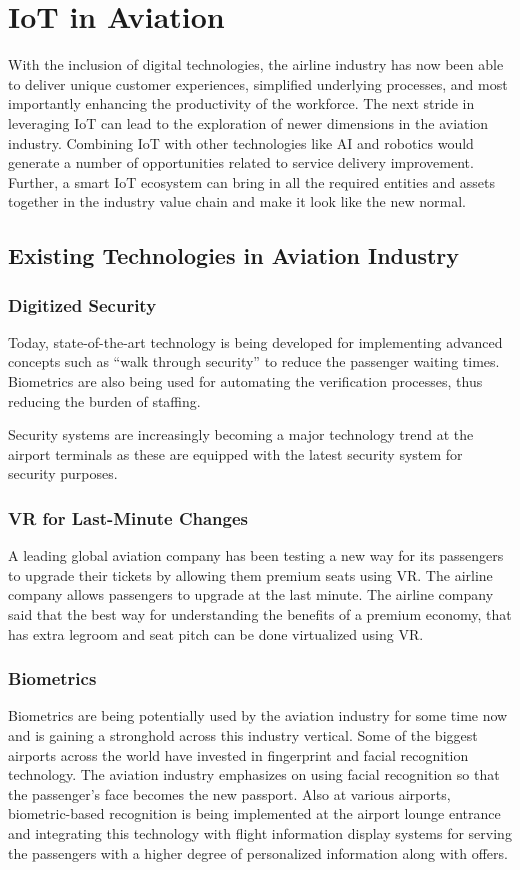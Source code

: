 \documentclass[a4paper,12pt]{article}
\begin{document}
\section{IoT in Aviation}
With the inclusion of digital technologies, the airline industry has now been able to deliver unique customer experiences, simplified underlying processes, and most importantly enhancing the productivity of the workforce. The next stride in leveraging IoT can lead to the exploration of newer dimensions in the aviation industry. Combining IoT with other technologies like AI and robotics would generate a number of opportunities related to service delivery improvement. Further, a smart  IoT ecosystem can bring in all the required entities and assets together in the industry value chain and make it look like the new normal.

\subsection{Existing Technologies in Aviation Industry}
\subsubsection{Digitized Security}
Today, state-of-the-art technology is being developed for implementing advanced concepts such as “walk through security” to reduce the passenger waiting times. Biometrics are also being used for automating the verification processes, thus reducing the burden of staffing.

Security systems are increasingly becoming a major technology trend at the airport terminals as these are equipped with the latest security system for security purposes.

\subsubsection{VR for Last-Minute Changes}
A leading global aviation company has been testing a new way for its passengers to upgrade their tickets by allowing them premium seats using VR. The airline company allows passengers to upgrade at the last  minute. The airline company said that the best way for understanding the benefits of a premium economy, that has extra legroom and seat pitch can be done virtualized using VR.

\subsubsection{Biometrics}
Biometrics are being potentially used by the aviation industry for some time now and is gaining a stronghold across this industry vertical. Some of the biggest airports across the world have invested in fingerprint and facial recognition technology. The aviation industry emphasizes on using facial recognition so that the passenger’s face becomes the new passport. Also at various airports, biometric-based recognition is being implemented at the airport lounge entrance and integrating this technology with flight information display systems for serving the passengers with a higher degree of personalized information along with offers.
\end{document}

